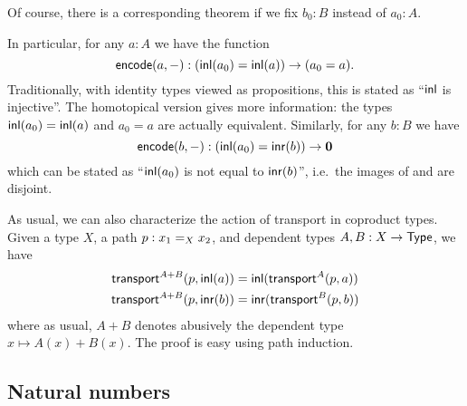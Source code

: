 Of course, there is a corresponding theorem if we fix $b_0:B$ instead of $a_0:A$.

In particular, for any $a:A$ we have the function
\[ \encode(a,-) : (\inl(a_0)=\inl(a)) \to (a_0=a).\]
Traditionally, with identity types viewed as propositions, this is stated as ``$\inl$ is injective''.
The homotopical version gives more information: the types $\inl(a_0)=\inl(a)$ and $a_0=a$ are actually equivalent.
Similarly, for any $b:B$ we have
\[ \encode(b,-) : (\inl(a_0)=\inr(b)) \to \emptyt \]
which can be stated as ``$\inl(a_0)$ is not equal to $\inr(b)$'', i.e.\ the images of \inl and \inr are disjoint.

As usual, we can also characterize the action of transport in coproduct types.
Given a type $X$, a path $p:\id[X]{x_1}{x_2}$, and dependent types $A,B:X\to\type$, we have
\begin{align*}
  \transfib{A+B}{p}{\inl(a)} &= \inl (\transfib{A}{p}{a})\\
  \transfib{A+B}{p}{\inr(b)} &= \inr (\transfib{B}{p}{b})
\end{align*}
where as usual, $A+B$ denotes abusively the dependent type $x\mapsto A(x)+B(x)$.
The proof is easy using path induction.


\subsection{Natural numbers}
\label{sec:compute-nat}







